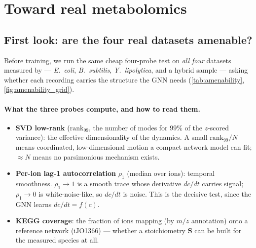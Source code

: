\documentclass[11pt]{article}
\begin{document}
\section{Toward real metabolomics}
\label{sec:realdata}

\subsection{First look: are the four real datasets amenable?}
\label{sec:amenability}

Before training, we run the same cheap four-probe test on \emph{all four} datasets measured by
\citet{link2015} --- \emph{E.\ coli}, \emph{B.\ subtilis}, \emph{Y.\ lipolytica}, and a hybrid
sample --- asking whether each recording carries the structure the GNN needs
(\cref{tab:amenability}, \cref{fig:amenability_grid}).

\paragraph{What the three probes compute, and how to read them.}
\begin{itemize}
  \item \textbf{SVD low-rank} ($\mathrm{rank}_{99}$, the number of modes for $99\%$ of the
    $z$-scored variance): the effective dimensionality of the dynamics. A small
    $\mathrm{rank}_{99}/N$ means coordinated, low-dimensional motion a compact network model can
    fit; $\approx N$ means no parsimonious mechanism exists.
  \item \textbf{Per-ion lag-1 autocorrelation} $\rho_1$ (median over ions): temporal smoothness.
    $\rho_1\to1$ is a smooth trace whose derivative $dc/dt$ carries signal; $\rho_1\to0$ is
    white-noise-like, so $dc/dt$ is noise. This is the decisive test, since the GNN learns
    $dc/dt=f(c)$.
  \item \textbf{KEGG coverage}: the fraction of ions mapping (by $m/z$ annotation) onto a
    reference network (iJO1366) --- whether a stoichiometry $\mathbf{S}$ can be built for the
    measured species at all.
\end{itemize}
\end{document}

